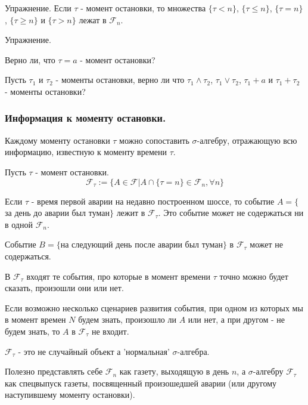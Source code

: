 {Упражнение. Если $\tau$ - момент остановки, то множества $\{\tau<n\}$,
$\{\tau\le n\}$, $\{\tau=n\}$, $\{\tau\ge n\}$ и $\{\tau>n\}$ лежат в
$\mathcal{F}_{n}$. \par



Упражнение. \par
Верно ли, что $\tau=a$ - момент остановки? \par

Пусть $\tau_1$ и $\tau_2$ - моменты остановки, верно ли что $\tau_1\wedge \tau_2$,
$\tau_1\vee \tau_2$, $\tau_1+a$ и $\tau_1+\tau_2$ - моменты остановки? \par

\subsubsection{Информация к моменту остановки.}

Каждому моменту остановки $\tau$ можно сопоставить $\sigma$-алгебру,
отражающую всю информацию, известную к моменту времени $\tau$. \par
\begin{mydef}
Пусть $\tau$ - момент остановки.
\begin{equation}
\mathcal{F}_{\tau}:=\{A \in \mathcal{F}|A\cap \{\tau=n \} \in
\mathcal{F}_{n},\forall n\}
\end{equation}
\end{mydef}



\begin{mydef}
Если $\tau$ - время первой аварии на недавно построенном
шоссе, то событие $A=\{$за день до аварии был туман$\}$ лежит в
$\mathcal{F}_{\tau}$. Это событие может не содержаться ни в одной
$\mathcal{F}_{n}$. \par
Событие $B=\{$на следующий день после аварии был туман$\}$ в
$\mathcal{F}_{\tau}$ может не содержаться.
\end{mydef}




В $\mathcal{F}_{\tau}$ входят те события, про которые в момент
времени $\tau$ точно можно будет
сказать, произошли они или нет.\par
Если возможно несколько сценариев развития события, при одном из
которых мы в момент времен $N$ будем знать, произошло ли $A$ или
нет, а при другом - не будем знать, то $A$ в $\mathcal{F}_{\tau}$ не
входит. \par
$\mathcal{F}_{\tau}$ - это не случайный объект а 'нормальная'
$\sigma$-алгебра. \par
Полезно представлять себе $\mathcal{F}_{n}$ как газету, выходящую
в день $n$, а $\sigma$-алгебру $\mathcal{F}_{\tau}$ как спецвыпуск
газеты, посвященный произошедшей аварии (или другому наступившему
моменту остановки). \par

}
